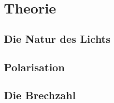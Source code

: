 
\section{Theorie}

\subsection{Die Natur des Lichts}

\subsection{Polarisation}

\subsection{Die Brechzahl}
